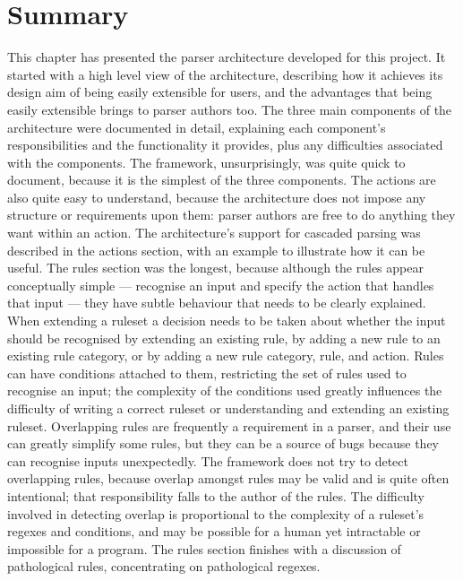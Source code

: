 \section{Summary}

This chapter has presented the parser architecture developed for this
project.  It started with a high level view of the architecture, describing
how it achieves its design aim of being easily extensible for users, and
the advantages that being easily extensible brings to parser authors too.
The three main components of the architecture were documented in detail,
explaining each component's responsibilities and the functionality it
provides, plus any difficulties associated with the components.  The
framework, unsurprisingly, was quite quick to document, because it is the
simplest of the three components.  The actions are also quite easy to
understand, because the architecture does not impose any structure or
requirements upon them: parser authors are free to do anything they want
within an action.  The architecture's support for cascaded parsing was
described in the actions section, with an example to illustrate how it can
be useful.  The rules section was the longest, because although the rules
appear conceptually simple --- recognise an input and specify the action
that handles that input --- they have subtle behaviour that needs to be
clearly explained.  When extending a ruleset a decision needs to be taken
about whether the input should be recognised by extending an existing rule,
by adding a new rule to an existing rule category, or by adding a new rule
category, rule, and action.  Rules can have conditions attached to them,
restricting the set of rules used to recognise an input; the complexity of
the conditions used greatly influences the difficulty of writing a correct
ruleset or understanding and extending an existing ruleset.  Overlapping
rules are frequently a requirement in a parser, and their use can greatly
simplify some rules, but they can be a source of bugs because they can
recognise inputs unexpectedly.  The framework does not try to detect
overlapping rules, because overlap amongst rules may be valid and is quite
often intentional; that responsibility falls to the author of the rules.
The difficulty involved in detecting overlap is proportional to the
complexity of a ruleset's regexes and conditions, and may be possible for a
human yet intractable or impossible for a program.  The rules section
finishes with a discussion of pathological rules, concentrating on
pathological regexes.

